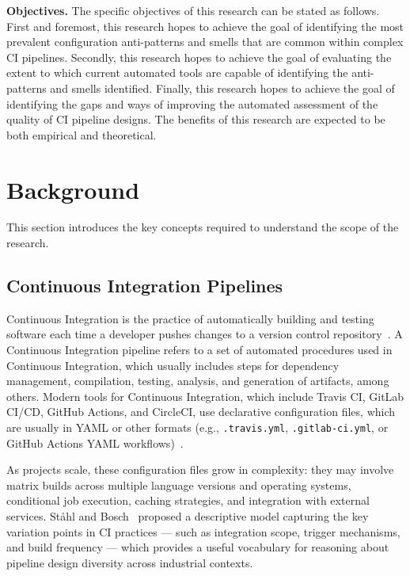 \documentclass[a4paper,11pt,oneside]{article}
\begin{document}
\textbf{Objectives.} The specific objectives of this research can be stated as follows. First and foremost, this research hopes to achieve the goal of identifying the most prevalent configuration anti-patterns and smells that are common within complex CI pipelines. Secondly, this research hopes to achieve the goal of evaluating the extent to which current automated tools are capable of identifying the anti-patterns and smells identified. Finally, this research hopes to achieve the goal of identifying the gaps and ways of improving the automated assessment of the quality of CI pipeline designs. The benefits of this research are expected to be both empirical and theoretical.

\pagebreak

\section{Background}

This section introduces the key concepts required to understand the scope of the research.

\subsection{Continuous Integration Pipelines}

Continuous Integration is the practice of automatically building and testing software each time a developer pushes changes to a version control repository~\cite{Shahin2017}. A Continuous Integration pipeline refers to a set of automated procedures used in Continuous Integration, which usually includes steps for dependency management, compilation, testing, analysis, and generation of artifacts, among others. Modern tools for Continuous Integration, which include Travis CI, GitLab CI/CD, GitHub Actions, and CircleCI, use declarative configuration files, which are usually in YAML or other formats (e.g., \texttt{.travis.yml}, \texttt{.gitlab-ci.yml}, or GitHub Actions YAML workflows)~\cite{Kinsman2021, Gallaba2022}.

\vspace{0.3cm}

As projects scale, these configuration files grow in complexity: they may involve matrix builds across multiple language versions and operating systems, conditional job execution, caching strategies, and integration with external services. St\aa{}hl and Bosch~\cite{Stahl2014} proposed a descriptive model capturing the key variation points in CI practices --- such as integration scope, trigger mechanisms, and build frequency --- which provides a useful vocabulary for reasoning about pipeline design diversity across industrial contexts.
\end{document}
